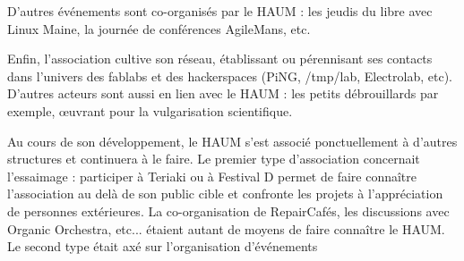 \documentclass[a4paper,10pt]{scrartcl}
\begin{document}
D'autres événements sont co-organisés par le HAUM : les jeudis du libre avec Linux Maine, la journée de conférences AgileMans, etc.

Enfin, l'association cultive son réseau, établissant ou pérennisant ses contacts dans l'univers des fablabs et des hackerspaces (PiNG, /tmp/lab, Electrolab, etc). D'autres acteurs sont aussi en lien avec le HAUM : les petits débrouillards  par exemple, œuvrant pour la vulgarisation scientifique.  

Au cours de son développement, le HAUM s'est associé ponctuellement à d'autres structures et continuera à le faire.
Le premier type d'association concernait l'essaimage : participer à Teriaki ou à Festival D permet de faire connaître l'association au delà de son public cible et confronte les projets à l'appréciation de personnes extérieures. La co-organisation de RepairCafés, les discussions avec Organic Orchestra, etc... étaient autant de moyens de faire connaître le HAUM.
Le second type était axé sur l'organisation d’événements
\end{document}

